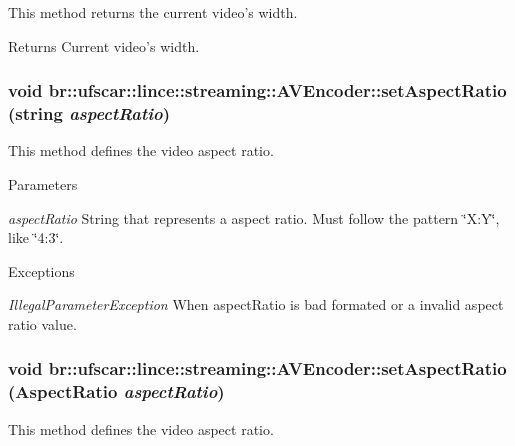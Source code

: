 This method returns the current video's width. 

\begin{DoxyReturn}{Returns}
Current video's width. 
\end{DoxyReturn}
\hypertarget{classbr_1_1ufscar_1_1lince_1_1streaming_1_1AVEncoder_add827b33c1376309a7e7e0d0a48430b3}{
\subsubsection[{setAspectRatio}]{\setlength{\rightskip}{0pt plus 5cm}void br::ufscar::lince::streaming::AVEncoder::setAspectRatio (string {\em aspectRatio})}}
\label{classbr_1_1ufscar_1_1lince_1_1streaming_1_1AVEncoder_add827b33c1376309a7e7e0d0a48430b3}


This method defines the video aspect ratio. 


\begin{DoxyParams}{Parameters}
\item[{\em aspectRatio}]String that represents a aspect ratio. Must follow the pattern \char`\"{}X:Y\char`\"{}, like \char`\"{}4:3\char`\"{}. \end{DoxyParams}

\begin{DoxyExceptions}{Exceptions}
\item[{\em IllegalParameterException}]When aspectRatio is bad formated or a invalid aspect ratio value. \end{DoxyExceptions}
\hypertarget{classbr_1_1ufscar_1_1lince_1_1streaming_1_1AVEncoder_a3c37076aa4aed91b30def7bf9495aee2}{
\subsubsection[{setAspectRatio}]{\setlength{\rightskip}{0pt plus 5cm}void br::ufscar::lince::streaming::AVEncoder::setAspectRatio ({\bf AspectRatio} {\em aspectRatio})}}
\label{classbr_1_1ufscar_1_1lince_1_1streaming_1_1AVEncoder_a3c37076aa4aed91b30def7bf9495aee2}


This method defines the video aspect ratio. 


